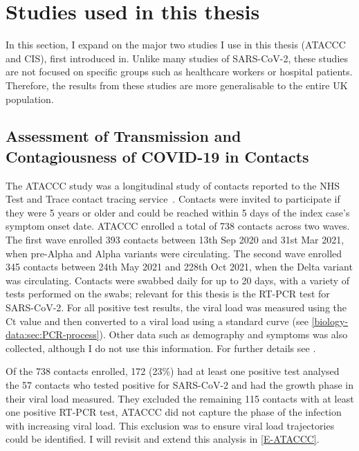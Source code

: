 \documentclass[thesis.tex]{subfiles}
\begin{document}
\section{Studies used in this thesis} \label{biology-data:sec:studies}

In this section, I expand on the major two studies I use in this thesis (ATACCC and CIS), first introduced in.
Unlike many studies of SARS-CoV-2, these studies are not focused on specific groups such as healthcare workers or hospital patients.
Therefore, the results from these studies are more generalisable to the entire UK population.


\subsection{Assessment of Transmission and Contagiousness of COVID-19 in Contacts} \label{biology-data:sec:ataccc}

The ATACCC study was a longitudinal study of contacts reported to the NHS Test and Trace contact tracing service~\autocite{hakkiOnset}.
Contacts were invited to participate if they were 5 years or older and  could be reached within 5 days of the index case's symptom onset date.
ATACCC enrolled a total of 738 contacts across two waves.
The first wave enrolled 393 contacts between 13th Sep 2020 and 31st Mar 2021, when pre-Alpha and Alpha variants were circulating.
The second wave enrolled 345 contacts between 24th May 2021 and 228th Oct 2021, when the Delta variant was circulating.
Contacts were swabbed daily for up to 20 days, with a variety of tests performed on the swabs; relevant for this thesis is the RT-PCR test for SARS-CoV-2.
For all positive test results, the viral load was measured using the Ct value and then converted to a viral load using a standard curve (see \cref{biology-data:sec:PCR-process}).
Other data such as demography and symptoms was also collected, although I do not use this information.
For further details see \textcite{singanayagamDuration,hakkiOnset}.

Of the 738 contacts enrolled, 172 (23\%) had at least one positive test
\Textcite{hakkiOnset} analysed the 57 contacts who tested positive for SARS-CoV-2 and had the growth phase in their viral load measured.
They excluded the remaining 115 contacts with at least one positive RT-PCR test, ATACCC did not capture the phase of the infection with increasing viral load.
This exclusion was to ensure viral load trajectories could be identified.
I will revisit and extend this analysis in \cref{E-ATACCC}.
\end{document}
